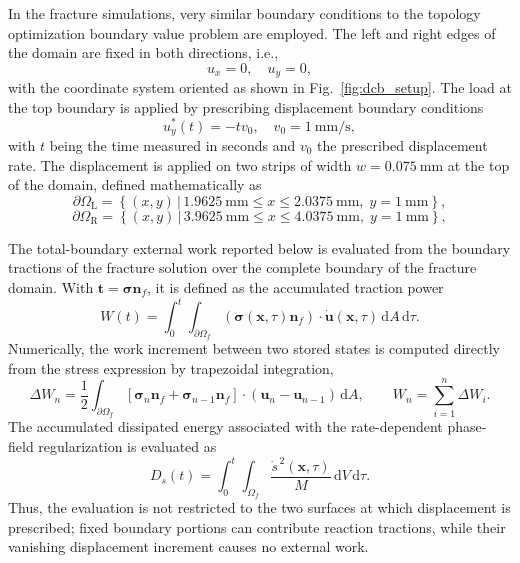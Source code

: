 \documentclass[
	pdflatex,
	sn-mathphys-num
]{sn-jnl}
\theoremstyle{thmstyleone}%
\theoremstyle{thmstyletwo}%
\theoremstyle{thmstylethree}%
\begin{document}
In the fracture simulations, very similar boundary conditions to
the topology optimization boundary value problem are employed.
The left and right edges of the domain are fixed in both
directions, i.e.,
\[
	u_x = 0, \quad u_y = 0,
\]
with the coordinate system oriented as shown in
Fig.~\ref{fig:dcb_setup}. The load at the top boundary is
applied by prescribing displacement boundary conditions
\[
	u_y^*(t) = -t v_0, \quad v_0 = 1~\mathrm{mm}/\mathrm{s},
\]
with $t$ being the time measured in seconds and $v_0$
the prescribed displacement rate. The displacement is applied on
two strips of width $w = 0.075~\mathrm{mm}$ at the top of the
domain, defined mathematically as
\begin{equation}
	\partial\Omega_{\mathrm{L}} =
	\left\{ (x,y) \,\Big|\, 1.9625~\mathrm{mm} \le x \le
	2.0375~\mathrm{mm},\; y=1~\mathrm{mm} \right\},
	\label{eq:left_strip}
\end{equation}
\begin{equation}
	\partial\Omega_{\mathrm{R}} =
	\left\{ (x,y) \,\Big|\, 3.9625~\mathrm{mm} \le x \le
	4.0375~\mathrm{mm},\; y=1~\mathrm{mm} \right\},
	\label{eq:right_strip}
\end{equation}

The total-boundary external work reported below is evaluated
from the boundary tractions of the fracture solution over the
complete boundary of the fracture domain. With
$\boldsymbol{t}=\boldsymbol{\sigma}\boldsymbol{n}_f$, it is
defined as the accumulated traction power
\begin{equation}
	W(t) =
	\int_{0}^{t}
	\int_{\partial\Omega_f}
	\left(\boldsymbol{\sigma}(\boldsymbol{x},\tau)
	\boldsymbol{n}_f\right)
	\cdot\dot{\boldsymbol{u}}(\boldsymbol{x},\tau)
	\,\mathrm{d}A\,\mathrm{d}\tau .
	\label{eq:total_boundary_work}
\end{equation}
Numerically, the work increment between two stored states is
computed directly from the stress expression by trapezoidal
integration,
\begin{equation}
	\Delta W_n =
	\frac{1}{2}
	\int_{\partial\Omega_f}
	\left[
	\boldsymbol{\sigma}_n\boldsymbol{n}_f
	+\boldsymbol{\sigma}_{n-1}\boldsymbol{n}_f
	\right]\cdot
	\left(\boldsymbol{u}_n-\boldsymbol{u}_{n-1}\right)
	\,\mathrm{d}A,
	\qquad
	W_n = \sum_{i=1}^{n}\Delta W_i .
	\label{eq:total_boundary_work_trapezoidal}
\end{equation}
The accumulated dissipated energy associated with the rate-dependent
phase-field regularization is evaluated as
\begin{equation}
	D_s(t) =
	\int_{0}^{t}\int_{\Omega_f}
	\frac{\dot{s}^{\,2}(\boldsymbol{x},\tau)}{M}
	\,\mathrm{d}V\,\mathrm{d}\tau .
	\label{eq:phase_field_dissipation}
\end{equation}
Thus, the evaluation is not restricted to the two surfaces at
which displacement is prescribed; fixed boundary portions can
contribute reaction tractions, while their vanishing
displacement increment causes no external work.
\end{document}
